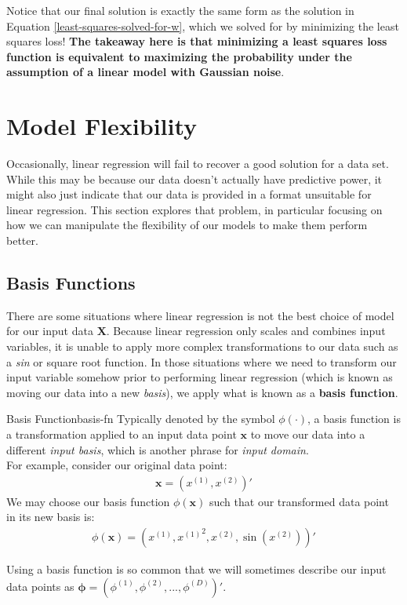 Notice that our final solution is exactly the same form as the solution in Equation \ref{least-squares-solved-for-w}, which we solved for by minimizing the least squares loss! \textbf{The takeaway here is that minimizing a least squares loss function is equivalent to maximizing the probability under the assumption of a linear model with Gaussian noise}.

\section{Model Flexibility}
Occasionally, linear regression will fail to recover a good solution for a data set. While this may be because our data doesn't actually have predictive power, it might also just indicate that our data is provided in a format unsuitable for linear regression. This section explores that problem, in particular focusing on how we can manipulate the flexibility of our models to make them perform better.

\subsection{Basis Functions}
There are some situations where linear regression is not the best choice of model for our input data $\textbf{X}$. Because linear regression only scales and combines input variables, it is unable to apply more complex transformations to our data such as a \textit{sin} or square root function. In those situations where we need to transform our input variable somehow prior to performing linear regression (which is known as moving our data into a new \textit{basis}), we apply what is known as a \textbf{basis function}.

\begin{definition}{Basis Function}{basis-fn}
    Typically denoted by the symbol $\phi(\cdot)$, a basis function is a transformation applied to an input data point $\textbf{x}$ to move our data into a different \textit{input basis}, which is another phrase for \textit{input domain}. \\

    For example, consider our original data point:
    \begin{align*}
    \textbf{x} = (x^{(1)}, x^{(2)})'
    \end{align*}
    We may choose our basis function $\phi(\textbf{x})$ such that our transformed data point in its new basis is:
    \begin{align*}
        \phi(\textbf{x}) = (x^{(1)}, {x^{(1)}}^2, x^{(2)}, \sin(x^{(2)}))'
    \end{align*}

    Using a basis function is so common that we will sometimes describe our input data points as $\boldsymbol{\phi} = (\phi^{(1)}, \phi^{(2)}, ..., \phi^{(D)})'$.
\end{definition}


